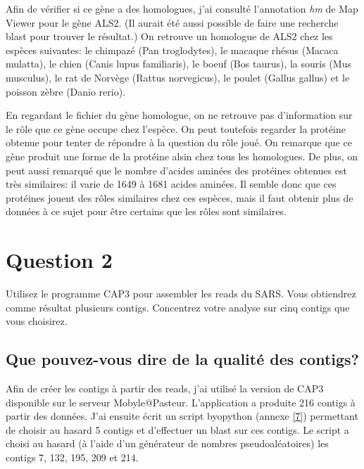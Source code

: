 \documentclass[10.8pt]{article} %
\begin{document}
Afin de vérifier si ce gène a des homologues, j'ai consulté l'annotation \emph{hm} de Map Viewer pour le gène ALS2. (Il aurait
été aussi possible de faire une recherche blast pour trouver le résultat.) On retrouve un homologue de ALS2 chez les espèces suivantes:
le chimpazé (Pan troglodytes), le macaque rhésus (Macaca mulatta), le chien (Canis lupus familiaris), le boeuf (Bos taurus), la souris
(Mus musculus), le rat de Norvège (Rattus norvegicus), le poulet (Gallus gallus) et le poisson zèbre (Danio rerio). 

En regardant le fichier du gène homologue, on ne retrouve pas d'information sur le rôle que ce gène occupe
chez l'espèce. On peut toutefois regarder la protéine obtenue pour tenter de répondre à la question du rôle joué.
On remarque que ce gène produit une forme de la protéine alsin chez tous les homologues. De plus, on peut aussi remarqué
que le nombre d'acides aminées des protéines obtenues est très similaires: il varie de 1649 à 1681 acides aminées. Il semble
donc que ces protéines jouent des rôles similaires chez ces espèces, mais il faut obtenir plus de données à ce sujet pour être 
certains que les rôles sont similaires.

 
\section{Question 2} %

Utilisez le programme CAP3 pour assembler les reads du SARS. Vous obtiendrez comme résultat plusieurs contigs. Concentrez
votre analyse sur cinq contigs que vous choisirez.

\subsection[Qualité des contigs]{Que pouvez-vous dire de la qualité des contigs?}

Afin de créer les contigs à partir des reads, j'ai utilisé la version de CAP3 disponible sur le serveur Mobyle@Pasteur.
L'application a produite 216 contigs à partir des données. J'ai ensuite écrit un script byopython (annexe \ref{7}) permettant de choisir
au hasard 5 contigs et d'effectuer un blast sur ces contigs. Le script a choisi au hasard (à l'aide d'un générateur de
nombres pseudoaléatoires) les contigs 7, 132, 195, 209 et 214.
\end{document}
